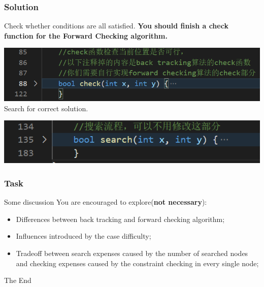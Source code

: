 \documentclass{beamer}
\begin{document}
\begin{frame}
  \frametitle{Solution}
      Check whether conditions are all satisfied.
      \textbf{You should finish a check function for the Forward Checking algorithm.}
      
      
      \includegraphics[width=.9\textwidth]{Pic/check}
      Search for correct solution.
      
      \includegraphics[width=.9\textwidth]{Pic/search}

\end{frame}


\begin{frame}
  \frametitle{Task}
  \begin{block}{Some discussion}
	  You are encouraged to explore(\textbf{not necessary}):
    \begin{itemize}
      \item Differences between back tracking and forward checking algorithm;
	  \item Influences introduced by the case difficulty;
	  \item Tradeoff between search expenses caused by the number of searched nodes and checking expenses caused by the constraint checking in every single node;
    \end{itemize}
  \end{block}
\end{frame}


\begin{frame}
  \Huge{\centerline{The End}}
\end{frame}

\end{document}
